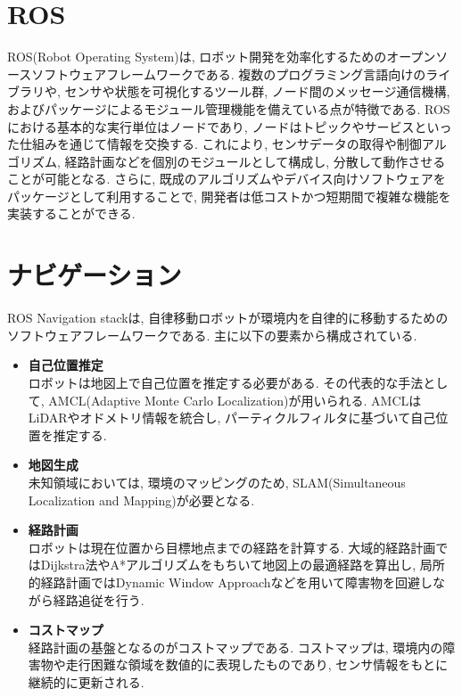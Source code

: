 \section{ROS}
ROS(Robot Operating System)は, ロボット開発を効率化するためのオープンソースソフトウェアフレームワークである. 
複数のプログラミング言語向けのライブラリや, センサや状態を可視化するツール群, ノード間のメッセージ通信機構, およびパッケージによるモジュール管理機能を備えている点が特徴である. 
ROSにおける基本的な実行単位はノードであり, ノードはトピックやサービスといった仕組みを通じて情報を交換する. 
これにより, センサデータの取得や制御アルゴリズム, 経路計画などを個別のモジュールとして構成し, 分散して動作させることが可能となる. 
さらに, 既成のアルゴリズムやデバイス向けソフトウェアをパッケージとして利用することで, 開発者は低コストかつ短期間で複雑な機能を実装することができる. 



\section{ナビゲーション}
ROS Navigation stackは, 自律移動ロボットが環境内を自律的に移動するためのソフトウェアフレームワークである. 主に以下の要素から構成されている. 
\begin{itemize}
     \item \textbf{自己位置推定}\\
     ロボットは地図上で自己位置を推定する必要がある. その代表的な手法として, AMCL(Adaptive Monte Carlo Localization)が用いられる. 
     AMCLはLiDARやオドメトリ情報を統合し, パーティクルフィルタに基づいて自己位置を推定する. 
     \item \textbf{地図生成}\\
     未知領域においては, 環境のマッピングのため, SLAM(Simultaneous Localization and Mapping)が必要となる. 
     \item \textbf{経路計画}\\
     ロボットは現在位置から目標地点までの経路を計算する. 大域的経路計画ではDijkstra法やA*アルゴリズムをもちいて地図上の最適経路を算出し, 局所的経路計画ではDynamic Window Approachなどを用いて障害物を回避しながら経路追従を行う. 
     \item \textbf{コストマップ}\\
     経路計画の基盤となるのがコストマップである. コストマップは, 環境内の障害物や走行困難な領域を数値的に表現したものであり, センサ情報をもとに継続的に更新される. 
\end{itemize}